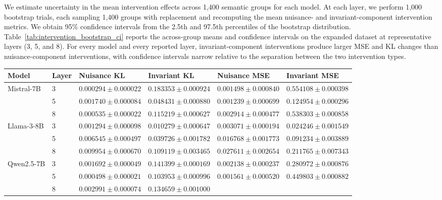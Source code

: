 We estimate uncertainty in the mean intervention effects across 1,400 semantic groups for each model. At each layer, we perform 1,000 bootstrap trials, each sampling 1,400 groups with replacement and recomputing the mean nuisance- and invariant-component intervention metrics. We obtain 95\% confidence intervals from the 2.5th and 97.5th percentiles of the bootstrap distribution. Table~\ref{tab:intervention_bootstrap_ci} reports the across-group means and confidence intervals on the expanded dataset at representative layers (3, 5, and 8). For every model and every reported layer, invariant-component interventions produce larger MSE and KL changes than nuisance-component interventions, with confidence intervals narrow relative to the separation between the two intervention types.

\begin{table}[!htbp]
\centering
\small
\setlength{\tabcolsep}{3pt}
\renewcommand{\arraystretch}{1.15}
\begin{tabular}{p{1.5cm} p{0.75cm} p{2.00cm} p{2.00cm} p{2.00cm} p{2.00cm}}
\toprule
Model & Layer
& Nuisance KL & Invariant KL
& Nuisance MSE & Invariant MSE \\
\midrule
Mistral-7B
& 3
& $0.000294 \pm 0.000022$
& $0.183353 \pm 0.000924$
& $0.001498 \pm 0.000840$
& $0.554108 \pm 0.000398$ \\
& 5
& $0.001740 \pm 0.000084$
& $0.048431 \pm 0.000880$
& $0.001239 \pm 0.000699$
& $0.124954 \pm 0.000296$ \\
& 8
& $0.000535 \pm 0.000022$
& $0.115219 \pm 0.000627$
& $0.002914 \pm 0.000477$
& $0.538303 \pm 0.000858$ \\
\midrule
Llama-3-8B
& 3
& $0.001294 \pm 0.000098$
& $0.010279 \pm 0.000647$
& $0.003071 \pm 0.000194$
& $0.024246 \pm 0.001549$ \\
& 5
& $0.006545 \pm 0.000497$
& $0.039726 \pm 0.001782$
& $0.016768 \pm 0.001773$
& $0.091234 \pm 0.003889$ \\
& 8
& $0.009954 \pm 0.000670$
& $0.109119 \pm 0.003465$
& $0.027611 \pm 0.002654$
& $0.211765 \pm 0.007343$ \\
\midrule
Qwen2.5-7B
& 3
& $0.001692 \pm 0.000049$
& $0.141399 \pm 0.000169$
& $0.002138 \pm 0.000237$
& $0.280972 \pm 0.000876$ \\
& 5
& $0.000498 \pm 0.000021$
& $0.103953 \pm 0.000996$
& $0.001561 \pm 0.000520$
& $0.449803 \pm 0.000882$ \\
& 8
& $0.002991 \pm 0.000074$
& $0.134659 \pm 0.001000$

\end{tabular}
\end{table}
